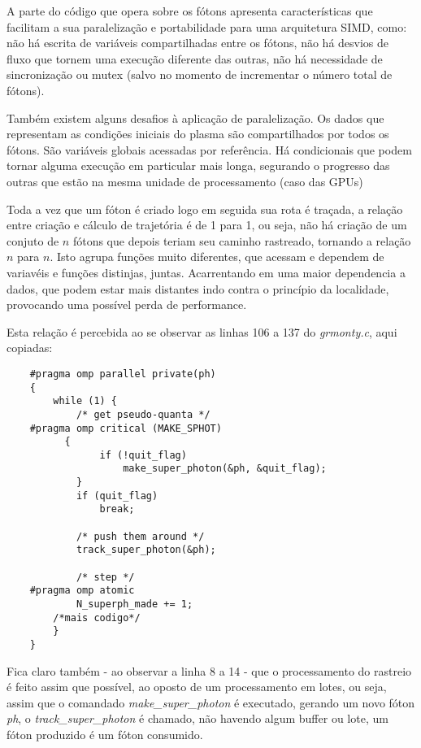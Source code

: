   A parte do código que opera sobre os fótons apresenta características que facilitam a sua paralelização e portabilidade para uma arquitetura SIMD, como: não há escrita de variáveis compartilhadas entre os fótons, não há desvios de fluxo que tornem uma execução diferente das outras, não há necessidade de sincronização ou mutex (salvo no momento de incrementar o número total de fótons).
  
  Também existem alguns desafios à aplicação de paralelização. Os dados que representam as condições iniciais do plasma são compartilhados por todos os fótons. São variáveis globais acessadas por referência. Há condicionais que podem tornar alguma execução em particular mais longa, segurando o progresso das outras que estão na mesma unidade de processamento (caso das GPUs)

  Toda a vez que um fóton é criado logo em seguida sua rota é traçada, a relação entre criação e cálculo de trajetória é de 1 para 1, ou seja, não há criação de um conjuto de $n$ fótons que depois teriam seu caminho rastreado, tornando a relação $n$ para $n$. Isto agrupa funções muito diferentes, que acessam e dependem de variavéis e funções distinjas, juntas. Acarrentando em uma maior dependencia a dados, que podem estar mais distantes indo contra o princípio da localidade, provocando uma possível perda de performance.
  
  Esta relação é percebida ao se observar as linhas 106 a 137 do \textit{grmonty.c}, aqui copiadas:

  \label{sec:main_loop}
  \begin{lstlisting}
    #pragma omp parallel private(ph)
  	{
  		while (1) {
  			/* get pseudo-quanta */
    #pragma omp critical (MAKE_SPHOT)
  		  {
  				if (!quit_flag)
  					make_super_photon(&ph, &quit_flag);
  			}
  			if (quit_flag)
  				break;

  			/* push them around */
  			track_super_photon(&ph);

  			/* step */
    #pragma omp atomic
  			N_superph_made += 1;
        /*mais codigo*/
  		}
  	}
  \end{lstlisting}

  Fica claro também - ao observar a linha 8 a 14 - que o processamento do rastreio é feito assim que possível, ao oposto de um processamento em lotes, ou seja, assim que o comandado \textit{make\_super\_photon} é executado, gerando um novo fóton \textit{ph}, o  \textit{track\_super\_photon} é chamado, não havendo algum buffer ou lote, um fóton produzido é um fóton consumido.

